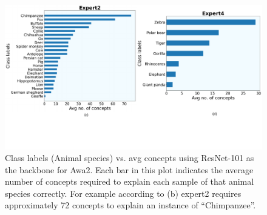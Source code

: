 \begin{figure}
\centering
\includegraphics[width=1\linewidth]
{figures/Supp/Avg_concept_class_CNN_Awa2_2.pdf}
\caption{Class labels (Animal species) vs. avg concepts using ResNet-101 as the backbone for Awa2. Each bar in this plot indicates the average number of concepts required to explain each sample of that animal species correctly. For example according to (b) expert2 requires approximately 72 concepts to explain an instance of ``Chimpanzee''.}
\label{fig:Awa2_CNN_b}
\end{figure}



